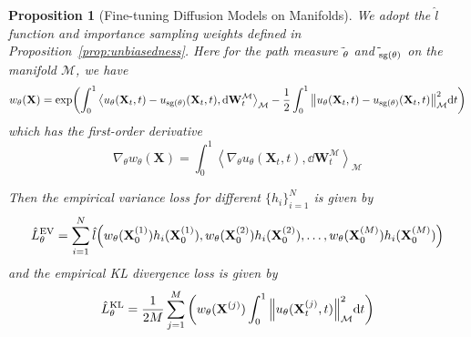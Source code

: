 \documentclass{article}
\theoremstyle{plain}
\newtheorem{proposition}[theorem]{Proposition}
\theoremstyle{definition}
\theoremstyle{remark}
\let\P\relax
\DeclareMathOperator{\P}{\mathbb{P}}
\DeclareMathOperator{\sg}{\mathrm{sg}}
\newcommand{\inner}[2]{\left\langle #1, #2\right\rangle}
\begin{document}
\begin{proposition}[Fine-tuning Diffusion Models on Manifolds]\label{prop:diffusion_model_finetune}
    We adopt the $\hat{l}$ function and importance sampling weights defined in Proposition~\ref{prop:unbiasedness}. Here for the path measure $\tilde{\P}_\theta$ and $\tilde{\P}_{\sg(\theta)}$ on the manifold $\mathcal{M}$, we have
    \begin{equation}
        w_\theta(\mathbf{X}) = \exp(\int_0^1 \inner{u_\theta(\mathbf{X}_t, t)-u_{\sg(\theta)}(\mathbf{X}_t, t)}{\dd \mathbf{W}_t^\mathcal{M}}_\mathcal{M} -\frac{1}{2}\int_0^1 \norm{u_\theta(\mathbf{X}_t, t)-u_{\sg(\theta)}(\mathbf{X}_t, t)}^2_\mathcal{M} \dd t)
    \end{equation}
    which has the first-order derivative
    \begin{equation}
        \nabla_\theta w_\theta(\mathbf{X}) = \int_0^1 \inner{\nabla_\theta u_\theta(\mathbf{X}_t, t)}{\dd \mathbf{W}_t^\mathcal{M}}_\mathcal{M}
    \end{equation}
    
    Then the empirical variance loss for different $\{h_i\}_{i=1}^N$ is given by
    \begin{equation}
        \hat{L}_\theta^\text{EV} = \sum_{i=1}^{N}\hat{l}\qty(w_\theta(\mathbf{X}_0^{(1)})h_i(\mathbf{X}_0^{(1)}), w_\theta(\mathbf{X}_0^{(2)})h_i(\mathbf{X}_0^{(2)}), \dots, w_\theta(\mathbf{X}_0^{(M)})h_i(\mathbf{X}_0^{(M)}))
    \end{equation}
    and the empirical KL divergence loss is given by
    \begin{equation}
        \hat{L}_\theta^\text{KL} = \frac{1}{2M} \sum_{j=1}^M \qty(w_\theta(\mathbf{X}^{(j)}) \int_0^1 \norm{u_\theta(\mathbf{X}_t^{(j)}, t)}_\mathcal{M}^2 \dd t)
    \end{equation}
\end{proposition}

\end{document}
